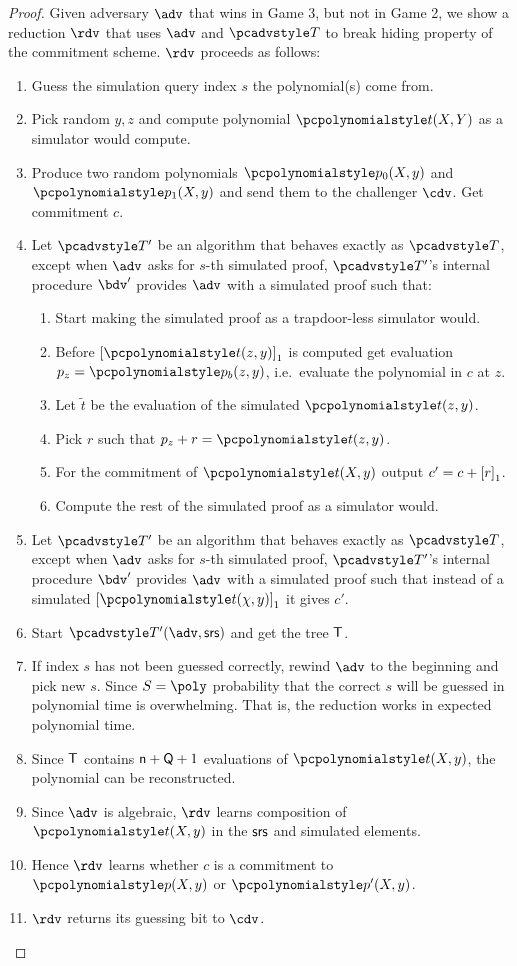 \documentclass[runningheads,11pt]{llncs}
\begin{document}
\begin{proof}
   Given adversary $\adv$ that wins in Game 3, but not
  in Game 2, we show a reduction $\rdv$ that uses $\adv$ and $\tdv$ to break
  hiding property of the commitment scheme. $\rdv$ proceeds as follows:
  \begin{enumerate}
  \item Guess the simulation query index $s$ the polynomial(s) come from.
  \item Pick random $y, z$ and compute polynomial $\p{t} (X, Y)$ as a simulator
    would compute.
  \item Produce two random polynomials $\p{p_0} (X, y)$ and $\p{p_1} (X, y)$ and
    send them to the challenger $\cdv$. Get commitment $c$.
  \item Let $\tdv'$ be an algorithm that behaves exactly as $\tdv$, except when
    $\adv$ asks for $s$-th simulated proof, $\tdv'$'s internal procedure $\bdv'$
    provides $\adv$ with a simulated proof such that:
    \begin{enumerate}
    \item Start making the simulated proof as a trapdoor-less simulator would.
    \item Before $\gone{\p{t} (z , y)}$ is computed
      get evaluation $p_z = \p{p_b} (z, y)$, i.e.~evaluate the polynomial in
      $c$ at $z$. 
    \item Let $\tilde{t}$ be the evaluation of the simulated $\p{t} (z, y)$.
    \item Pick $r$ such that $p_z + r = \p{t} (z, y)$.
    \item For the commitment of $\p{t} (X, y)$ output $c' = c + \left[r\right]_{1}$.
    \item Compute the rest of the simulated proof as a simulator would.
    \end{enumerate}
  \item Let $\tdv'$ be an algorithm that behaves exactly as $\tdv$, except when
    $\adv$ asks for $s$-th simulated proof, $\tdv'$'s internal procedure $\bdv'$
    provides $\adv$ with a simulated proof such that instead of a simulated
    $\gone{\p{t} (\chi, y)}$ it gives $c'$.
  \item Start $\tdv'(\adv, \srs)$ and get the tree $\mathsf{T}$.
  \item If index $s$ has not been guessed correctly, rewind $\adv$ to
    the beginning and pick new $s$. Since $S = \poly$ probability that
    the correct $s$ will be guessed in polynomial time is overwhelming. That is,
    the reduction works in expected polynomial time. 
  \item Since $\mathsf{T}$ contains $\mathsf{n} + \mathsf{Q} + 1$ evaluations of
    $\p{t} (X, y)$, the polynomial can be reconstructed.
  \item Since $\adv$ is algebraic, $\rdv$ learns composition of $\p{t} (X, y)$ in
    the $\mathsf{srs}$ and simulated elements. 
  \item Hence $\rdv$ learns whether $c$ is a commitment to $\p{p} (X, y)$ or
    $\p{p'} (X, y)$.
  \item $\rdv$ returns its guessing bit to $\cdv$.
  \end{enumerate}
 \end{proof}
\end{document}
